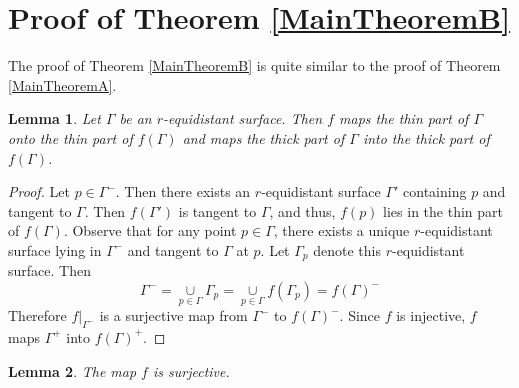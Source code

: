 \documentclass[12pt,reqno,oneside]{amsart}
\theoremstyle{plain}
\newtheorem{Lemma}{Lemma}[section]
\theoremstyle{definition}
\theoremstyle{remark}
\numberwithin{equation}{section}
\newcommand{\Ga}{{\Gamma}}
\newcommand{\below}[2]{{\mathop{#1}\limits_{#2}}}
\newcommand{\thin}[1]{{{#1}}}
\begin{document}
\section{Proof of Theorem \eqref{MainTheoremB}}
The proof of Theorem \eqref{MainTheoremB} is quite similar to the proof of Theorem \eqref{MainTheoremA}.
\begin{Lemma} \label{thinthick}
	Let $\Ga$ be an $r$-equidistant surface.  Then $f$ maps the thin part of $\Ga$
	onto the thin part of $f(\Ga)$ and maps the thick part of $\Ga$ into the
	thick part of $f(\Ga)$.
\end{Lemma}
\begin{proof}
	Let $p \in \thin{\Ga^-}$.  Then there exists an $r$-equidistant surface $\Ga'$
	containing $p$ and tangent to $\Ga$.  Then $f(\Ga')$ is tangent to $\Ga$,
	and thus, $f(p)$ lies in the thin part of $f(\Ga)$.  Observe that for any point $p \in \Ga$, there exists a unique $r$-equidistant surface lying in $\Ga^-$ and  tangent to $\Ga$ at $p$.  Let $\Ga_p$ denote this $r$-equidistant surface.  Then
	\begin{equation}
		\Ga^-=\below{\cup}{p\in \Ga}\Ga_p=\below{\cup}{p\in \Ga}f(\Ga_p)=f(\Ga)^-
	\end{equation}
	Therefore $f|_{\Ga^-}$ is a surjective map from $\Ga^-$ to $f(\Ga)^-$.  Since $f$ is
	injective, $f$ maps $\Ga^+$ into $f(\Ga)^+$.
\end{proof}
\begin{Lemma} \label{f_surjective}
	The map $f$ is surjective.
\end{Lemma}
\end{document}

